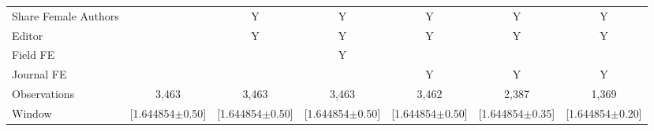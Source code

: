 \begin{tabular}{l*{6}{c}}
Share Female Authors &         &        Y&        Y&        Y&        Y&        Y\\
Editor          &         &        Y&        Y&        Y&        Y&        Y\\
Field FE        &         &         &        Y&         &         &         \\
Journal FE      &         &         &         &        Y&        Y&        Y\\
\hline
Observations    &    3,463&    3,463&    3,463&    3,462&    2,387&    1,369\\
Window          &[1.644854$\pm$0.50]&[1.644854$\pm$0.50]&[1.644854$\pm$0.50]&[1.644854$\pm$0.50]&[1.644854$\pm$0.35]&[1.644854$\pm$0.20]\\
\hline\hline
\end{tabular}
